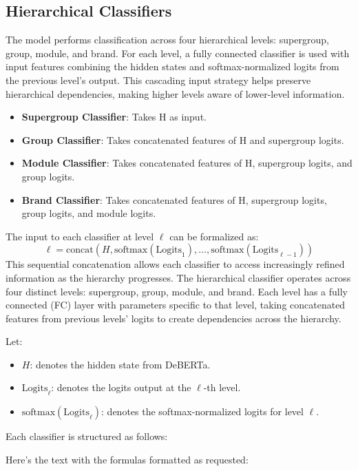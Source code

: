 \documentclass[9pt,a4paper,twoside]{rho-class/rho}
\begin{document}
      \subsection{Hierarchical Classifiers}

        The model performs classification across four hierarchical levels: supergroup, group, module, and brand. For each level, a fully connected classifier is used with input features combining the hidden states and softmax-normalized logits from the previous level’s output. This cascading input strategy helps preserve hierarchical dependencies, making higher levels aware of lower-level information.

\begin{itemize}
    \item \textbf{Supergroup Classifier}: Takes H as input.
    \item \textbf{Group Classifier}: Takes concatenated features of H and supergroup logits.
    \item \textbf{Module Classifier}: Takes concatenated features of H, supergroup logits, and group logits.
    \item \textbf{Brand Classifier}: Takes concatenated features of H, supergroup logits, group logits, and module logits.
\end{itemize}
The input to each classifier at level $ \ell $  can be formalized as:
\[
\ell = \text{concat}(H, \text{softmax}(\text{Logits}_1), \ldots, \text{softmax}(\text{Logits}_{\ell-1}))
\]
This sequential concatenation allows each classifier to access increasingly refined information as the hierarchy progresses. The hierarchical classifier operates across four distinct levels: supergroup, group, module, and brand. Each level has a fully connected (FC) layer with parameters specific to that level, taking concatenated features from previous levels’ logits to create dependencies across the hierarchy.

Let:

\begin{itemize}
    \item $H$: denotes the hidden state from DeBERTa.
    \item $\text{Logits}_\ell$: denotes the logits output at the $\ell$-th level.
    \item $\text{softmax}(\text{Logits}_\ell)$: denotes the softmax-normalized logits for level $\ell$.
\end{itemize}
Each classifier is structured as follows:

Here's the text with the formulas formatted as requested:
\end{document}
